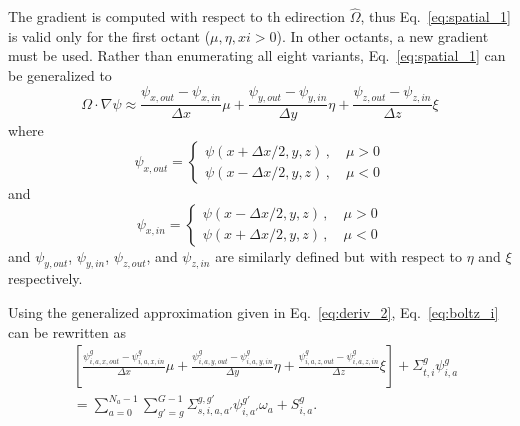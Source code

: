 The gradient is computed with respect to th edirection $\hat{\Omega}$, thus Eq.~\ref{eq:spatial_1} is valid only for the first octant ($\mu, \eta, xi > 0$). In other octants, a new gradient must be used. Rather than enumerating all eight variants, Eq.~\ref{eq:spatial_1} can be generalized to
\begin{equation} \label{eq:deriv_2}
\Omega \cdot \nabla \psi \approx 
\frac{\psi_{x,out} - \psi_{x,in}}{\Delta x} \mu + 
\frac{\psi_{y,out} - \psi_{y,in}}{\Delta y} \eta + 
\frac{\psi_{z,out} - \psi_{z,in}}{\Delta z} \xi
\end{equation}
where
\begin{equation}
\psi_{x,out} = 
\begin{cases}
\psi(x+\Delta x/2, y, z) \,, \quad \mu > 0 \\
\psi(x-\Delta x/2, y, z) \,, \quad \mu < 0
\end{cases}
\end{equation}
and
\begin{equation}
\psi_{x,in} = 
\begin{cases}
\psi(x-\Delta x/2, y, z) \,, \quad \mu > 0 \\
\psi(x+\Delta x/2, y, z) \,, \quad \mu < 0
\end{cases}
\end{equation}
and $\psi_{y,out}$, $\psi_{y,in}$, $\psi_{z,out}$, and $\psi_{z,in}$ are similarly defined but with respect to $\eta$ and $\xi$ respectively.


Using the generalized approximation given in Eq.~\ref{eq:deriv_2}, Eq.~\ref{eq:boltz_i} can be rewritten as
\begin{equation} \label{eq:boltz_i2}
\begin{split}
&\left[ 
\frac{\psi_{i,a,x,out}^g - \psi_{i,a,x,in}^g}{\Delta x} \mu + 
\frac{\psi_{i,a,y,out}^g - \psi_{i,a,y,in}^g}{\Delta y} \eta + 
\frac{\psi_{i,a,z,out}^g - \psi_{i,a,z,in}^g}{\Delta z} \xi
\right]
+ \Sigma_{t,i}^g \psi_{i,a}^{g} \\
& = 
\sum_{a=0}^{N_a-1} \sum_{g'=g}^{G-1} \Sigma_{s, i, a, a'}^{g, g'} \psi_{i, a'}^{g'} \omega_a + S_{i,a}^g.
\end{split}
\end{equation}

